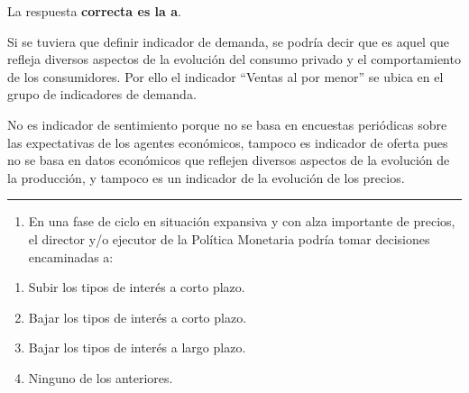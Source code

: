 \documentclass[
  letterpaper,
  DIV=11,
  numbers=noendperiod]{scrreprt}
\providecommand{\tightlist}{%
  \setlength{\itemsep}{0pt}\setlength{\parskip}{0pt}}\usepackage{longtable,booktabs,array}
\begin{document}
\begin{tcolorbox}[enhanced jigsaw, left=2mm, opacityback=0, colback=white, breakable, arc=.35mm, bottomrule=.15mm, rightrule=.15mm, toprule=.15mm, leftrule=.75mm, colframe=quarto-callout-tip-color-frame]
\begin{minipage}[t]{5.5mm}
\textcolor{quarto-callout-tip-color}{\faLightbulb}
\end{minipage}%
\begin{minipage}[t]{\textwidth - 5.5mm}

La respuesta \textbf{correcta es la a}.

Si se tuviera que definir indicador de demanda, se podría decir que es
aquel que refleja diversos aspectos de la evolución del consumo privado
y el comportamiento de los consumidores. Por ello el indicador ``Ventas
al por menor'' se ubica en el grupo de indicadores de demanda.

No es indicador de sentimiento porque no se basa en encuestas periódicas
sobre las expectativas de los agentes económicos, tampoco es indicador
de oferta pues no se basa en datos económicos que reflejen diversos
aspectos de la evolución de la producción, y tampoco es un indicador de
la evolución de los precios.

\end{minipage}%
\end{tcolorbox}

\begin{center}\rule{0.5\linewidth}{0.5pt}\end{center}

\begin{enumerate}
\def\labelenumi{\arabic{enumi}.}
\setcounter{enumi}{10}
\tightlist
\item
  En una fase de ciclo en situación expansiva y con alza importante de
  precios, el director y/o ejecutor de la Política Monetaria podría
  tomar decisiones encaminadas a:
\end{enumerate}

\begin{enumerate}
\def\labelenumi{\alph{enumi})}
\item
  Subir los tipos de interés a corto plazo.
\item
  Bajar los tipos de interés a corto plazo.
\item
  Bajar los tipos de interés a largo plazo.
\item
  Ninguno de los anteriores.
\end{enumerate}
\end{document}
